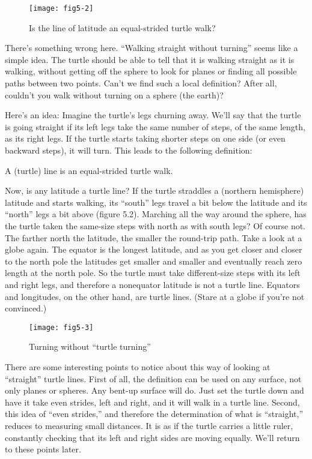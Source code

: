 \documentclass{book}
\begin{document}
\begin{figure}
\begin{center}
\texttt{[image: fig5-2]}
\caption{Is the line of latitude an equal-strided turtle walk?}
\end{center}
\end{figure}

There's something wrong here. ``Walking straight without turning''
seems like a simple idea. The turtle should be able to tell that it is
walking straight as it is walking, without getting off the sphere to look
for planes or finding all possible paths between two points. Can't we find
such a local definition? After all, couldn't you walk without turning on
a sphere (the earth)?

Here's an idea: Imagine the turtle's legs churning away. We'll say that
the turtle is going straight if its left legs take the same number of steps,
of the same length, as its right legs. If the turtle starts taking shorter
steps on one side (or even backward steps), it will turn. This leads to
the following definition:

A (turtle) line is an equal-strided turtle walk.

Now, is any latitude a turtle line? If the turtle straddles a (northern
hemisphere) latitude and starts walking, its ``south'' legs travel a bit
below the latitude and its ``north'' legs a bit above (figure 5.2). Marching
all the way around the sphere, has the turtle taken the same-size steps
with north as with south legs? Of course not. The farther north the
latitude, the smaller the round-trip path. Take a look at a globe again.
The equator is the longest latitude, and as you get closer and closer to
the north pole the latitudes get smaller and smaller and eventually reach
zero length at the north pole. So the turtle must take different-size steps
with its left and right legs, and therefore a nonequator latitude is not a
turtle line. Equators and longitudes, on the other hand, are turtle lines.
(Stare at a globe if you're not convinced.)

\begin{figure}
\begin{center}
\texttt{[image: fig5-3]}
\caption{Turning without ``turtle turning''}
\end{center}
\end{figure}

There are some interesting points to notice about this way of looking
at ``straight'' turtle lines. First of all, the definition can be used on any
surface, not only planes or spheres. Any bent-up surface will do. Just
set the turtle down and have it take even strides, left and right, and
it will walk in a turtle line. Second, this idea of ``even strides,'' and
therefore the determination of what is ``straight,'' reduces to measuring
small distances. It is as if the turtle carries a little ruler, constantly
checking that its left and right sides are moving equally. We'll return
to these points later.
\end{document}
